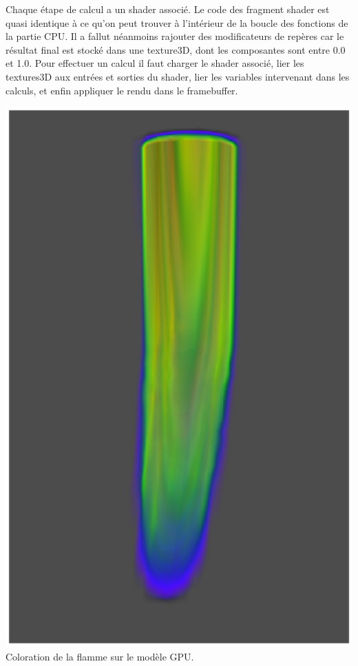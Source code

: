\documentclass[a4paper,10pt]{article}
\begin{document}
Chaque étape de calcul a un shader associé. Le code des fragment shader 
est quasi identique à ce qu'on peut trouver à l'intérieur de la boucle
des fonctions de la partie CPU. Il a fallut néanmoins rajouter des modificateurs
de repères car le résultat final est stocké dans une texture3D, dont les composantes
sont entre 0.0 et 1.0. Pour effectuer un calcul il faut charger le shader associé,
lier les textures3D aux entrées et sorties du shader, lier les variables intervenant
dans les calculs, et enfin appliquer le rendu dans le framebuffer.\\


    \begin{center}
	\includegraphics[scale=0.5]{GPU.ps}\\
	Coloration de la flamme sur le modèle GPU.
    \end{center}
 
\end{document}
